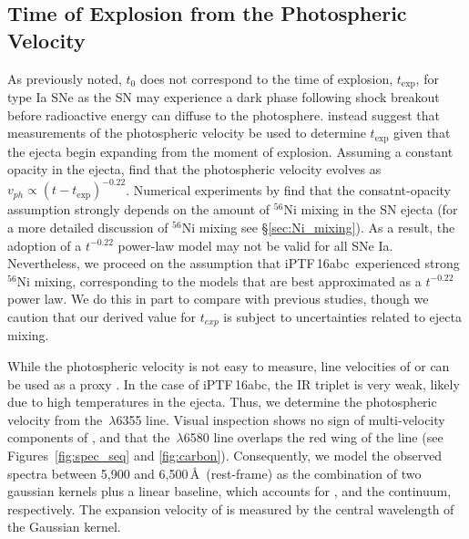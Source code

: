 \documentclass[twocolumn]{aastex61}
\newcommand{\abc}{iPTF\,16abc}
\begin{document}
\subsection{Time of Explosion from the Photospheric Velocity}
\label{sec:early_vel}

As previously noted, $t_0$ does not correspond to the time of 
explosion, $t_\mathrm{exp}$, for type Ia SNe as the SN may 
experience a dark phase following shock breakout before radioactive 
energy can diffuse to the photosphere. \citet{2014ApJ...784...85P} 
instead suggest that measurements of the photospheric velocity be 
used to determine $t_\mathrm{exp}$ given that the ejecta begin 
expanding from the moment of explosion.  Assuming a
constant opacity in the ejecta, \citeauthor{2014ApJ...784...85P} 
find that the photospheric velocity evolves as
$v_{ph}\propto(t-t_\mathrm{exp})^{-0.22}$. Numerical experiments by \citet{2016ApJ...826...96P} find that the consatnt-opacity assumption strongly depends on the amount of $^{56}$Ni mixing in the SN ejecta (for a more detailed discussion of $^{56}$Ni mixing see \S\ref{sec:Ni_mixing}). As a result, the adoption of a $t^{-0.22}$ power-law model may not be valid for all SNe Ia. Nevertheless, we proceed on the assumption that \abc\ experienced strong $^{56}$Ni mixing, corresponding to the models that are best approximated as a $t^{-0.22}$ power law. We do this in part to compare with previous studies, though we caution that our derived value for $t_{exp}$ is subject to uncertainties related to ejecta mixing. 

While the photospheric velocity
is not easy to measure, line velocities of  or 
can be used as a proxy
\citep{2014ApJ...784...85P,2016ApJ...826..144S}. In the case of \abc, the  IR triplet is very weak, 
likely due to high temperatures in the ejecta. Thus, we
determine the photospheric velocity from the 
\,$\lambda$6355 line. Visual inspection shows no 
sign of multi-velocity components of , and that 
the \,$\lambda$6580 line overlaps the red
wing of the  line (see Figures~\ref{fig:spec_seq} and \ref{fig:carbon}). Consequently, we model the observed 
spectra between 5,900 and 6,500\,\AA\ (rest-frame) as the combination 
of two gaussian kernels plus a linear baseline, which
accounts for ,  and the
continuum, respectively. The expansion
velocity of  is measured by the central wavelength
of the  Gaussian kernel.
\end{document}
